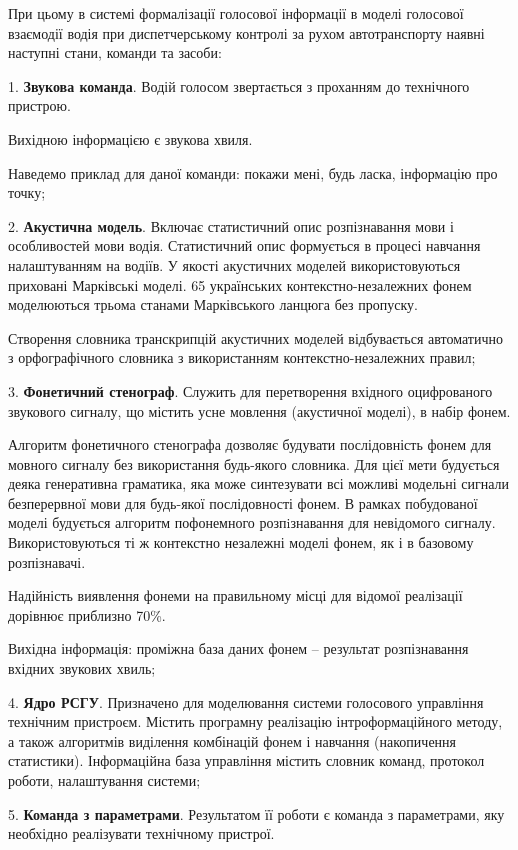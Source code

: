 При цьому в системі формалізації голосової інформації в моделі голосової взаємодії водія при диспетчерському контролі за рухом автотранспорту наявні наступні стани, команди та засоби:

1. \textbf{Звукова команда}. Водій голосом звертається з проханням до технічного пристрою.

Вихідною інформацією є звукова хвиля.

Наведемо приклад для даної команди: покажи мені, будь ласка, інформацію про точку;

2. \textbf{Акустична модель}. Включає статистичний опис розпізнавання мови і особливостей мови водія. Статистичний опис формується в процесі навчання налаштуванням на водіїв. У якості акустичних моделей використовуються приховані Марківські моделі. 65 українських контекстно-незалежних фонем моделюються трьома станами Марківського ланцюга без пропуску.

Створення словника транскрипцій акустичних моделей відбувається автоматично з орфографічного словника з використанням контекстно-незалежних правил;

3. \textbf{Фонетичний стенограф}. Служить для перетворення вхідного оцифрованого звукового сигналу, що містить усне мовлення (акустичної моделі), в набір фонем.

Алгоритм фонетичного стенографа дозволяє будувати послідовність фонем для мовного сигналу без використання будь-якого словника. Для цієї мети будується деяка генеративна граматика, яка може синтезувати всі можливі модельні сигнали безперервної мови для будь-якої послідовності фонем. В рамках побудованої моделі будується алгоритм пофонемного розпiзнавання для невідомого сигналу. Використовуються ті ж контекстно незалежні моделі фонем, як і в базовому розпізнавачі.

Надійність виявлення фонеми на правильному місці для відомої реалізації дорівнює приблизно 70\%.

Вихідна інформація: проміжна база даних фонем – результат розпізнавання вхідних звукових хвиль;

4. \textbf{Ядро РСГУ}. Призначено для моделювання системи голосового управління технічним пристроєм. Містить програмну реалізацію інтроформаційного методу, а також алгоритмів виділення комбінацій фонем і навчання (накопичення статистики). Інформаційна база управління містить словник команд, протокол роботи, налаштування системи;

5. \textbf{Команда з параметрами}. Результатом її роботи є команда з параметрами, яку необхідно реалізувати технічному пристрої.

